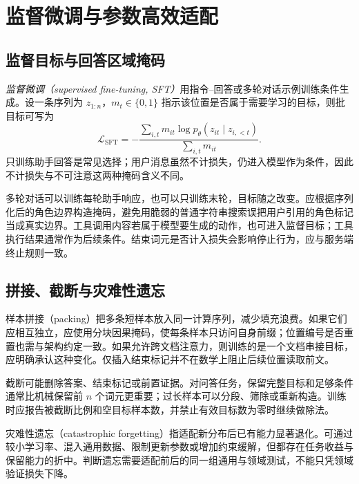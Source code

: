 \setcounter{chapter}{9} %
\chapter{监督微调与参数高效适配}
\label{ch:sft}

\section{监督目标与回答区域掩码}

\emph{监督微调（supervised fine-tuning, SFT）}用指令--回答或多轮对话示例训练条件生成。设一条序列为 $z_{1:n}$，$m_t\in\{0,1\}$ 指示该位置是否属于需要学习的目标，则批目标可写为
\begin{equation}
\mathcal L_{\mathrm{SFT}}=-\frac{\sum_{i,t}m_{it}\log p_\theta(z_{it}\mid z_{i,<t})}{\sum_{i,t}m_{it}}.
\label{eq:sft}
\end{equation}
只训练助手回答是常见选择；用户消息虽然不计损失，仍进入模型作为条件，因此不计损失与不可注意这两种掩码含义不同。

多轮对话可以训练每轮助手响应，也可以只训练末轮，目标随之改变。应根据序列化后的角色边界构造掩码，避免用脆弱的普通字符串搜索误把用户引用的角色标记当成真实边界。工具调用内容若属于模型要生成的动作，也可进入监督目标；工具执行结果通常作为后续条件。结束词元是否计入损失会影响停止行为，应与服务端终止规则一致。

\section{拼接、截断与灾难性遗忘}

样本拼接（packing）把多条短样本放入同一计算序列，减少填充浪费。如果它们应相互独立，应使用分块因果掩码，使每条样本只访问自身前缀；位置编号是否重置也需与架构约定一致。如果允许跨文档注意力，则训练的是一个文档串接目标，应明确承认这种变化。仅插入结束标记并不在数学上阻止后续位置读取前文。

截断可能删除答案、结束标记或前置证据。对问答任务，保留完整目标和足够条件通常比机械保留前 $n$ 个词元更重要；过长样本可以分段、筛除或重新构造。训练时应报告被截断比例和空目标样本数，并禁止有效目标数为零时继续做除法。

灾难性遗忘（catastrophic forgetting）指适配新分布后已有能力显著退化。可通过较小学习率、混入通用数据、限制更新参数或增加约束缓解，但都存在任务收益与保留能力的折中。判断遗忘需要适配前后的同一组通用与领域测试，不能只凭领域验证损失下降。

